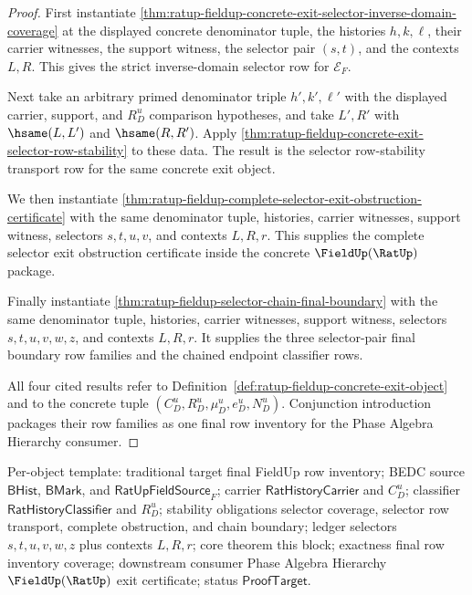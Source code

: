 \begin{proof}
First instantiate
\autoref{thm:ratup-fieldup-concrete-exit-selector-inverse-domain-coverage} at
the displayed concrete denominator tuple, the histories $h,k,\ell$, their
carrier witnesses, the support witness, the selector pair $(s,t)$, and the
contexts $L,R$. This gives the strict inverse-domain selector row for
$\mathcal E_F$.

Next take an arbitrary primed denominator triple $h',k',\ell'$ with the
displayed carrier, support, and $R_D^u$ comparison hypotheses, and take
$L',R'$ with $\hsame(L,L')$ and $\hsame(R,R')$. Apply
\autoref{thm:ratup-fieldup-concrete-exit-selector-row-stability} to these
data. The result is the selector row-stability transport row for the same
concrete exit object.

We then instantiate
\autoref{thm:ratup-fieldup-complete-selector-exit-obstruction-certificate} with
the same denominator tuple, histories, carrier witnesses, support witness,
selectors $s,t,u,v$, and contexts $L,R,r$. This supplies the complete selector
exit obstruction certificate inside the concrete $\FieldUp(\RatUp)$ package.

Finally instantiate \autoref{thm:ratup-fieldup-selector-chain-final-boundary}
with the same denominator tuple, histories, carrier witnesses, support witness,
selectors $s,t,u,v,w,z$, and contexts $L,R,r$. It supplies the three
selector-pair final boundary row families and the chained endpoint classifier
rows.

All four cited results refer to
Definition~\ref{def:ratup-fieldup-concrete-exit-object} and to the concrete
tuple $(C_D^u,R_D^u,\mu_D^u,e_D^u,N_D^u)$. Conjunction introduction packages
their row families as one final row inventory for the Phase Algebra Hierarchy
consumer.
\end{proof}

Per-object template: traditional target final FieldUp row inventory; BEDC
source $\mathsf{BHist}$, $\mathsf{BMark}$, and
$\mathsf{RatUpFieldSource}_F$; carrier $\mathsf{RatHistoryCarrier}$ and
$C_D^u$; classifier $\mathsf{RatHistoryClassifier}$ and $R_D^u$; stability
obligations selector coverage, selector row transport, complete obstruction,
and chain boundary; ledger selectors $s,t,u,v,w,z$ plus contexts $L,R,r$; core
theorem this block; exactness final row inventory coverage; downstream consumer
Phase Algebra Hierarchy $\FieldUp(\RatUp)$ exit certificate; status
$\mathsf{ProofTarget}$.
